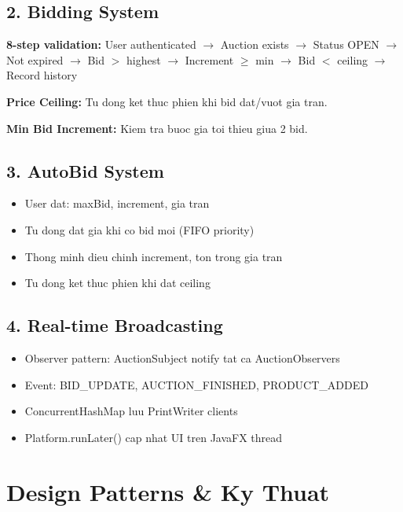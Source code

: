 ﻿\documentclass[12pt, a4paper]{report}
\begin{document}
\section{2. Bidding System}
\textbf{8-step validation:} User authenticated $\to$ Auction exists $\to$ Status OPEN $\to$ Not expired $\to$ Bid $>$ highest $\to$ Increment $\geq$ min $\to$ Bid $<$ ceiling $\to$ Record history

\textbf{Price Ceiling:} Tu dong ket thuc phien khi bid dat/vuot gia tran.

\textbf{Min Bid Increment:} Kiem tra buoc gia toi thieu giua 2 bid.

\section{3. AutoBid System}
\begin{itemize}
    \item User dat: maxBid, increment, gia tran
    \item Tu dong dat gia khi co bid moi (FIFO priority)
    \item Thong minh dieu chinh increment, ton trong gia tran
    \item Tu dong ket thuc phien khi dat ceiling
\end{itemize}

\section{4. Real-time Broadcasting}
\begin{itemize}
    \item Observer pattern: AuctionSubject notify tat ca AuctionObservers
    \item Event: BID\_UPDATE, AUCTION\_FINISHED, PRODUCT\_ADDED
    \item ConcurrentHashMap luu PrintWriter clients
    \item Platform.runLater() cap nhat UI tren JavaFX thread
\end{itemize}

\newpage

\chapter{Design Patterns \& Ky Thuat}
\end{document}
